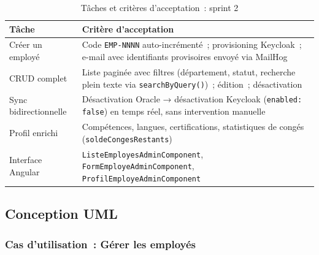 \begin{table}[H]
\centering
\caption{Tâches et critères d'acceptation~: sprint 2}
\label{tab:s2_obj}
\begin{tabularx}{\textwidth}{|l|L|}
\hline
{}\textbf{Tâche} & \textbf{Critère d'acceptation} \\\hline
{}
Créer un employé & Code \texttt{EMP-NNNN} auto-incrémenté~; provisioning Keycloak~;
  e-mail avec identifiants provisoires envoyé via MailHog \\\hline
CRUD complet & Liste paginée avec filtres (département, statut, recherche
  plein texte via \texttt{searchByQuery()})~; édition~; désactivation \\\hline
{}
Sync bidirectionnelle & Désactivation Oracle → désactivation Keycloak (\texttt{enabled: false})
  en temps réel, sans intervention manuelle \\\hline
Profil enrichi & Compétences, langues, certifications, statistiques de congés
  (\texttt{soldeCongesRestants}) \\\hline
{}
Interface Angular & \texttt{ListeEmployesAdminComponent}, \texttt{FormEmployeAdminComponent},
  \texttt{ProfilEmployeAdminComponent} \\\hline
\end{tabularx}
\end{table}

\subsection{Conception UML}

\subsubsection*{Cas d'utilisation~: Gérer les employés}

